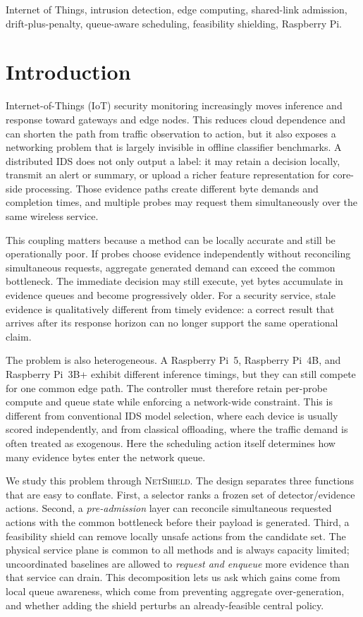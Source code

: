 \documentclass[10pt,journal]{IEEEtran}
\newcommand{\NetShield}{\textsc{NetShield}}
\begin{document}
\begin{IEEEkeywords}
Internet of Things, intrusion detection, edge computing, shared-link admission, drift-plus-penalty, queue-aware scheduling, feasibility shielding, Raspberry Pi.
\end{IEEEkeywords}

\section{Introduction}
Internet-of-Things (IoT) security monitoring increasingly moves inference and response toward gateways and edge nodes. This reduces cloud dependence and can shorten the path from traffic observation to action, but it also exposes a networking problem that is largely invisible in offline classifier benchmarks. A distributed IDS does not only output a label: it may retain a decision locally, transmit an alert or summary, or upload a richer feature representation for core-side processing. Those evidence paths create different byte demands and completion times, and multiple probes may request them simultaneously over the same wireless service.

This coupling matters because a method can be locally accurate and still be operationally poor. If probes choose evidence independently without reconciling simultaneous requests, aggregate generated demand can exceed the common bottleneck. The immediate decision may still execute, yet bytes accumulate in evidence queues and become progressively older. For a security service, stale evidence is qualitatively different from timely evidence: a correct result that arrives after its response horizon can no longer support the same operational claim.

The problem is also heterogeneous. A Raspberry Pi~5, Raspberry Pi~4B, and Raspberry Pi~3B+ exhibit different inference timings, but they can still compete for one common edge path. The controller must therefore retain per-probe compute and queue state while enforcing a network-wide constraint. This is different from conventional IDS model selection, where each device is usually scored independently, and from classical offloading, where the traffic demand is often treated as exogenous. Here the scheduling action itself determines how many evidence bytes enter the network queue.

We study this problem through \NetShield. The design separates three functions that are easy to conflate. First, a selector ranks a frozen set of detector/evidence actions. Second, a \emph{pre-admission} layer can reconcile simultaneous requested actions with the common bottleneck before their payload is generated. Third, a feasibility shield can remove locally unsafe actions from the candidate set. The physical service plane is common to all methods and is always capacity limited; uncoordinated baselines are allowed to \emph{request and enqueue} more evidence than that service can drain. This decomposition lets us ask which gains come from local queue awareness, which come from preventing aggregate over-generation, and whether adding the shield perturbs an already-feasible central policy.
\end{document}
